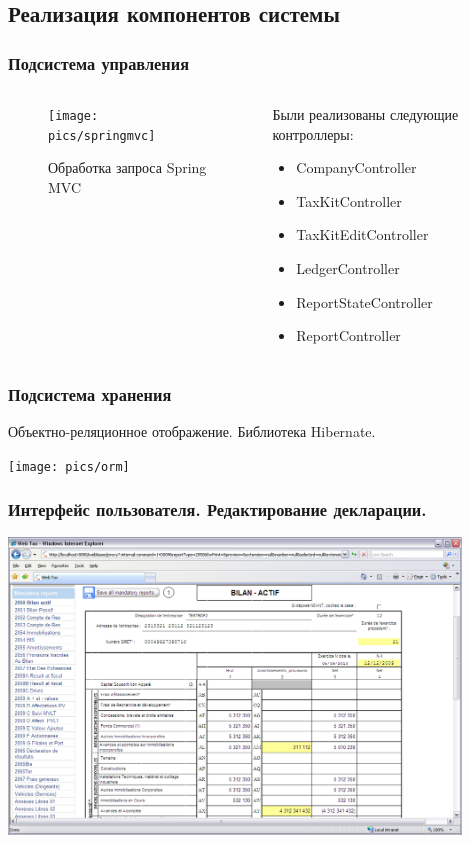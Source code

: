 \documentclass[xcolor=pdftex, dvipsnames, table]{beamer}
\begin{document}
\subsection{Реализация компонентов системы}
\begin{frame}
  \frametitle{Подсистема управления}
  \begin{columns}
    \begin{column}{0.6\textwidth}
      \begin{center}
        \begin{figure}
          \texttt{[image: pics/springmvc]}
          \caption{Обработка запроса Spring MVC}
          \label{pic:springmvc}
        \end{figure}
      \end{center}
    \end{column}
    \begin{column}{0.5\textwidth}
      Были реализованы следующие контроллеры:\\
      \begin{itemize}
        \item CompanyController
        \item TaxKitController
        \item TaxKitEditController
        \item LedgerController
        \item ReportStateController
        \item ReportController
      \end{itemize}
    \end{column}
  \end{columns}
\end{frame}

\begin{frame}
  \frametitle{Подсистема хранения}
  Объектно-реляционное отображение. Библиотека Hibernate.
  \begin{center}
    \texttt{[image: pics/orm]}
  \end{center}
\end{frame}

\begin{frame}
  \frametitle{Интерфейс пользователя. Редактирование декларации.}
  \begin{center}
    \includegraphics[width=0.9\textwidth]{pics/src_reportnice}
  \end{center}
\end{frame}
\end{document}
